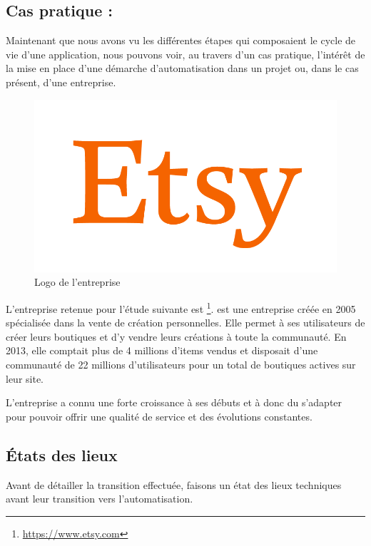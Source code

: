 \subsection{Cas pratique : \etsy}

Maintenant que nous avons vu les différentes étapes qui composaient le cycle de vie d'une application, nous pouvons voir, au travers d'un cas pratique, l'intérêt de la mise en place d'une démarche d'automatisation dans un projet ou, dans le cas présent, d'une entreprise.

\begin{figure}
	\includegraphics[scale=0.125]{img/etsy.png}
	\caption{Logo de l'entreprise \etsy}\label{fig:etsy}
\end{figure}

L'entreprise retenue pour l'étude suivante est \etsy\footnote{\url{https://www.etsy.com}}. \etsy{} est une entreprise créée en 2005 spécialisée dans la vente de création personnelles. Elle permet à ses utilisateurs de créer leurs boutiques et d'y vendre leurs créations à toute la communauté. En 2013, elle comptait plus de 4 millions d'items vendus et disposait d'une communauté de 22 millions d'utilisateurs pour un total de  boutiques actives sur leur site.

L'entreprise a connu une forte croissance à ses débuts et à donc du s'adapter pour pouvoir offrir une qualité de service et des évolutions constantes.

\subsection{États des lieux}

Avant de détailler la transition effectuée, faisons un état des lieux techniques avant leur transition vers l'automatisation.

